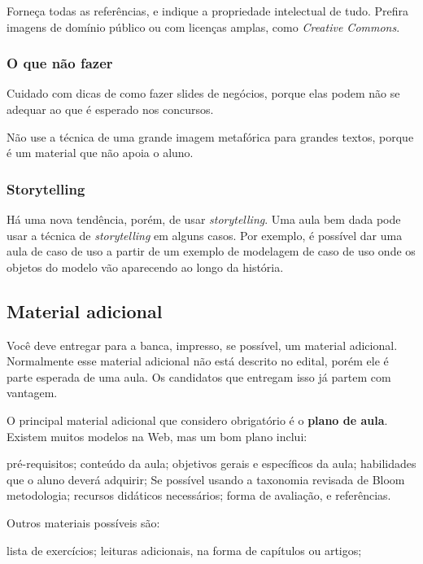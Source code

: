\documentclass[12pt]{article}
\begin{document}
Forneça todas as referências, e indique a propriedade intelectual de tudo.
Prefira imagens de domínio público ou com licenças amplas, como \textit{Creative Commons}.

\subsubsection{O que não fazer}

Cuidado com dicas de como fazer slides de negócios, porque elas podem não se adequar ao que é esperado nos concursos.

Não use a técnica de uma grande imagem metafórica para grandes textos, porque é um material que não apoia o aluno.

\subsubsection{Storytelling}

Há uma nova tendência, porém, de usar \textit{storytelling}.
Uma aula bem dada pode usar a técnica de \textit{storytelling} em alguns casos.
Por exemplo, é possível dar uma aula de caso de uso a partir de um exemplo de modelagem de caso de uso onde os objetos do modelo vão aparecendo ao longo da história.

\subsection{Material adicional}

Você deve entregar para a banca, impresso, se possível, um material adicional. Normalmente esse material adicional não está descrito no edital, porém ele é parte esperada de uma aula. Os candidatos que entregam isso já partem com vantagem.

O principal material adicional que considero obrigatório é o \textbf{plano de aula}. Existem muitos modelos na Web, mas um bom plano inclui:
\begin{outline}
\1 pré-requisitos;
\1 conteúdo da aula;
\1 objetivos gerais e específicos da aula;
\1 habilidades que o aluno deverá adquirir;
\2 Se possível usando a taxonomia revisada de Bloom
\1 metodologia;
\1 recursos didáticos necessários;
\1 forma de avaliação, e
\1 referências.
\end{outline}

Outros materiais possíveis são:
\begin{outline}
\1 lista de exercícios;
\1 leituras adicionais, na forma de capítulos ou artigos;
\end{outline}
\end{document}
